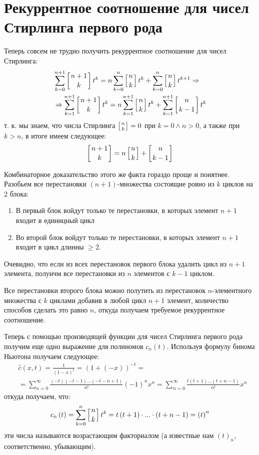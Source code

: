 \section{Рекуррентное соотношение для чисел Стирлинга первого рода}

Теперь совсем не трудно получить рекуррентное соотношение для чисел Стирлинга:
\[
	\begin{split}
		& \sum_{k=0}^{n+1} \left[n+1 \atop k\right] t^k = n \sum_{k=0}^n \left[n\atop k\right] t^k + \sum_{k=0}^n \left[n\atop k\right] t^{k+1} \Rightarrow\\
		& \Rightarrow \sum_{k=1}^{n+1} \left[n+1 \atop k\right] t^k = n \sum_{k=1}^{n+1} \left[n \atop k\right] t^k + \sum_{k=1}^{n+1} \left[n \atop k-1\right] t^k
	\end{split}
\]
т. к. мы знаем, что числа Стирлинга $\left[n \atop k\right] = 0$ при $k = 0 \land n > 0$, а также при $k > n$, в итоге имеем следующее:
\[
	\left[n+1 \atop k\right] = n \left[n \atop k\right] + \left[n \atop k-1\right]
\]

Комбинаторное доказательство этого же факта гораздо проще и понятнее. Разобьем все перестановки $\left(n+1\right)$-множества состоящие ровно из $k$ циклов на 2 блока:
\begin{enumerate}
\item В первый блок войдут только те перестановки, в которых элемент $n+1$ входит в единицный цикл

\item Во второй блок войдут только те перестановки, в которых элемент $n+1$ входит в цикл длинны $\ge 2$.
\end{enumerate}

Очевидно, что если из всех перестановок первого блока удалить цикл из $n+1$ элемента, полуичм все перестановки из $n$ элементов с $k-1$ циклом.

Все перестановки второго блока можно полутить из перестановок $n$-элементного множества с $k$ циклами добавив в любой цикл $n+1$ элемент, количество способов сделать это равно $n$, откуда получаем требуемое рекуррентное соотношение.

Теперь с помощью производящей функции для чисел Стирлинга первого рода получим еще одно выражение для полиномов $c_n\left(t\right)$. Используя формулу бинома Ньютона получаем следующее:
\[
	\begin{split}
		& \hat c\left(x,t\right) = \frac{1}{\left(1-x\right)^t} = \left(1 + \left(-x\right)\right)^{-t} = \\
		& = \sum_{n=0}^{\infty} \frac{\left(-t\right)\left(-t-1\right) ... \left(-t - n + 1\right)}{n!} \left(-1\right)^n x^n = \sum_{n=0}^{\infty} \frac{t\left(t+1\right)...\left(t+n-1\right)}{n!} x^n
	\end{split}
\]
откуда получаем, что:
\[
	c_n\left(t\right) = \sum_{k=0}^n \left[n\atop k\right] t^k = t\left(t+1\right)\cdot ... \cdot\left(t+n-1\right) = \left(t\right)^{n}
\]
эти числа называются возрастающим факториалом (а известные нам $\left(t\right)_n$, соответственно, убывающим).

